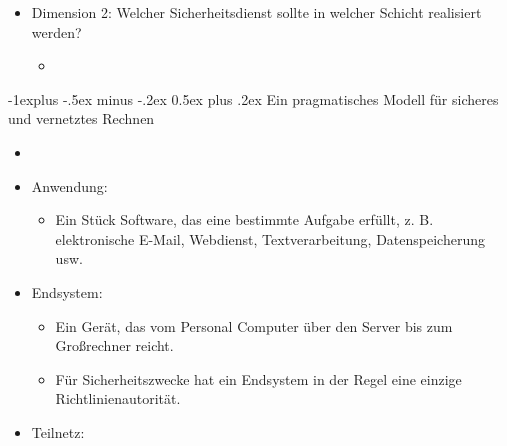 \documentclass[a4paper]{article}
\makeatletter
\renewcommand{\subsection}{\@startsection{subsection}{2}{0mm}%
 {-1explus -.5ex minus -.2ex}%
 {0.5ex plus .2ex}%
 {\normalfont\normalsize\bfseries}}
\makeatother
\begin{document}
\begin{multicols}{3}
\begin{itemize}
              \begin{itemize}
                  \item
              \end{itemize}
        \item
              Dimension 2: Welcher Sicherheitsdienst sollte in welcher Schicht
              realisiert werden?

              \begin{itemize}
                  \item
              \end{itemize}
    \end{itemize}


    \subsection{Ein pragmatisches Modell für sicheres und vernetztes
        Rechnen}

    \begin{itemize}
        \item
        \item
              Anwendung:

              \begin{itemize}
                  \item
                        Ein Stück Software, das eine bestimmte Aufgabe erfüllt, z. B.
                        elektronische E-Mail, Webdienst, Textverarbeitung, Datenspeicherung
                        usw.
              \end{itemize}
        \item
              Endsystem:

              \begin{itemize}
                  \item
                        Ein Gerät, das vom Personal Computer über den Server bis zum
                        Großrechner reicht.
                  \item
                        Für Sicherheitszwecke hat ein Endsystem in der Regel eine einzige
                        Richtlinienautorität.
              \end{itemize}
        \item
              Teilnetz:


\end{itemize}
\end{multicols}
\end{document}
